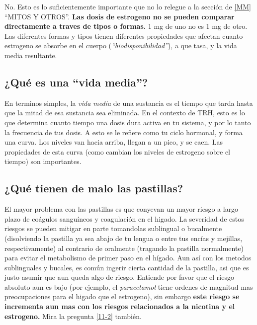 \documentclass{article}
\begin{document}
No. Esto es lo suficientemente importante que no lo relegue a la sección de \ref{MM} “MITOS Y OTROS”. \textbf{Las dosis de estrogeno no se pueden comparar directamente a traves de tipos o formas.} 1 mg de uno no es 1 mg de otro. Las diferentes formas y tipos tienen diferentes propiedades que afectan cuanto estrogeno se absorbe en el cuerpo (\textit{“biodisponibilidad”}), a que tasa, y la vida media resultante. 

\subsection{¿Qué es una “vida media”?}

En terminos simples, la \textit{vida media} de una sustancia es el tiempo que tarda hasta que la mitad de esa sustancia sea eliminada. En el contexto de TRH, esto es lo que determina cuanto tiempo una dosis dura activa en tu sistema, y por lo tanto la frecuencia de tus dosis. A esto se le refiere como tu ciclo hormonal, y forma una curva. Los niveles van hacia arriba, llegan a un pico, y se caen. Las propiedades de esta curva (como cambian los niveles de estrogeno sobre el tiempo) son importantes.

\subsection{¿Qué tienen de malo las pastillas?}

El mayor problema con las pastillas es que conyevan un mayor riesgo a largo plazo de coágulos sanguíneos y coagulación en el higado. La severidad de estos riesgos se pueden mitigar en parte tomandolas sublingual o bucalmente (disolviendo la pastilla ya sea abajo de tu lengua o entre tus encías y mejillas, respectivamente) al contrario de oralmente (tragando la pastilla normalmente) para evitar el metabolismo de primer paso en el hígado. Aun así con los metodos sublinguales y bucales, es común ingerir cierta cantidad de la pastilla, asi que es justo asumir que aun queda algo de riesgo. Entiende por favor que el riesgo absoluto aun es bajo (por ejemplo, el \textit{paracetamol} tiene ordenes de magnitud mas preocupaciones para el higado que el estrogeno), sin embargo \textbf{este riesgo se incrementa aun mas con los riesgos relacionados a la nicotina y el estrogeno.} Mira la pregunta \ref{11-2} también.
\end{document}
